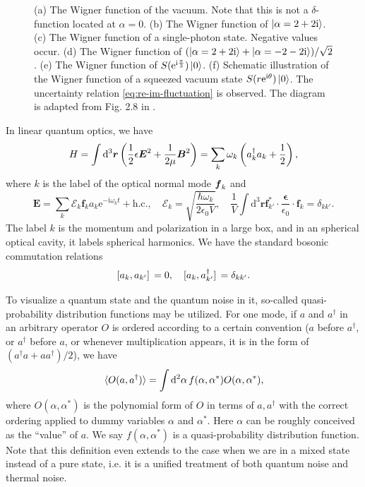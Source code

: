 \documentclass[hyperref, a4paper]{article}
\newcommand*{\ii}{\mathrm{i}}
\newcommand*{\ee}{\mathrm{e}}
\begin{document}
\begin{figure}
{    (a) The Wigner function of the vacuum. Note that this is not a $\delta$-function located at $\alpha = 0$.
    (b) The Wigner function of $\ket{\alpha = 2 + 2\ii}$.
    (c) The Wigner function of a single-photon state. Negative values occur.
    (d) The Wigner function of $(\ket{\alpha = 2 + 2 \ii} + \ket{\alpha = - 2 - 2 \ii}) / \sqrt{2}$.
    (e) The Wigner function of $S(\ee^{\ii \frac{\pi}{3}}) \ket{0}$.
    (f) Schematic illustration of the Wigner function of a squeezed vacuum state
    $S(r\ee^{\ii \theta}) \ket{0}$.
    The uncertainty relation \eqref{eq:re-im-fluctuation} is observed.
    The diagram is adapted from Fig. 2.8 in \cite{scully1999quantum}.
    }
    \label{fig:wigner-example}
\end{figure}

In linear quantum optics, we have \cite{steck2007quantum} 
\begin{equation}
    H = \int \dd[3]{\vb*{r}} \left( \frac{1}{2} \epsilon \vb*{E}^2 + \frac{1}{2 \mu} \vb*{B}^2 \right)
    = \sum_{k} \omega_k \left( a^\dagger_k a_k + \frac{1}{2} \right),
\end{equation}
where $k$ is the label of the optical normal mode $\vb*{f}_k$ and 
\begin{equation}
    \boldsymbol{E}=\sum_k \mathcal{E}_k \boldsymbol{f}_k a_k \mathrm{e}^{-\mathrm{i} \omega_k t}+\text {h.c.} , \quad 
    \mathcal{E}_k = \sqrt{\frac{\hbar \omega_k}{2 \epsilon_0 V}} , \quad \frac{1}{V} \int \mathrm{d}^3 \boldsymbol{r} \boldsymbol{f}_{k'}^* \cdot \frac{\boldsymbol{\epsilon}}{\epsilon_0} \cdot \boldsymbol{f}_k =\delta_{k k'} .
\end{equation}
The label $k$ is the momentum and polarization in a large box, 
and in an spherical optical cavity, it labels spherical harmonics.
We have the standard bosonic commutation relations 
\begin{equation}
    \comm*{a_k}{a_{k'}} = 0, \quad \comm*{a_k}{a^\dagger_{k'}} = \delta_{k k'}.
\end{equation}

To visualize a quantum state and the quantum noise in it,
so-called quasi-probability distribution functions may be utilized.
For one mode, if $a$ and $a^\dagger$ in an arbitrary operator $O$ is ordered according to a certain convention
($a$ before $a^\dagger$, or $a^\dagger$ before $a$, 
or whenever multiplication appears, it is in the form of $(a^\dagger a + a a^\dagger) / 2$), 
we have 
\begin{equation}
    \expval*{O(a, a^\dagger)} = \int \dd[2]{\alpha} f(\alpha, \alpha^*) O(\alpha, \alpha^*),
\end{equation}
where $O(\alpha, \alpha^*)$ is the 
polynomial form of $O$ in terms of $a, a^\dagger$ with the correct ordering
applied to dummy variables $\alpha$ and $\alpha^*$.
Here $\alpha$ can be roughly conceived as the ``value'' of $a$.
We say $f(\alpha, \alpha^*)$ is a quasi-probability distribution function.
Note that this definition even extends to the case 
when we are in a mixed state instead of a pure state, 
i.e. it is a unified treatment of both quantum noise and thermal noise.
\end{document}
